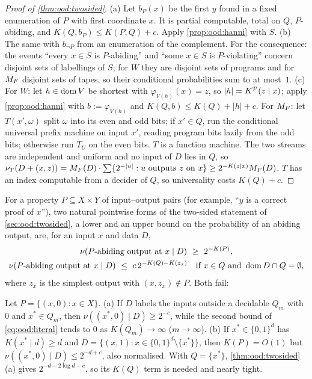 \begin{proof}[Proof of \cref{thm:ood:twosided}]
(a) Let $b_P(x)$ be the first $y$ found in a fixed enumeration of $P$ with first coordinate $x$. It is partial computable, total on $Q$, $P$-abiding, and $K(Q,b_P)\le K(P,Q)+c$. Apply \cref{prop:ood:hanni} with $S$. (b) The same with $b_{\neg P}$ from an enumeration of the complement. For the consequence: the events ``every $x\in S$ is $P$-abiding'' and ``some $x\in S$ is $P$-violating'' concern disjoint sets of labellings of $S$; for $W$ they are disjoint sets of programs and for $M_{F}$ disjoint sets of tapes, so their conditional probabilities sum to at most~$1$. (c) For $W$: let $h\in\operatorname{dom} V$ be shortest with $\varphi_{V(h)}(x)=z$, so $|h|=K^{\mathcal{P}}(z\mid x)$; apply \cref{prop:ood:hanni} with $b:=\varphi_{V(h)}$ and $K(Q,b)\le K(Q)+|h|+c$. For $M_{F}$: let $T(x',\omega)$ split $\omega$ into its even and odd bits; if $x'\in Q$, run the conditional universal prefix machine on input $x'$, reading program bits lazily from the odd bits; otherwise run $T_U$ on the even bits. $T$ is a function machine. The two streams are independent and uniform and no input of $D$ lies in $Q$, so $\nu_T(D+(x,z))=M_{F}(D)\cdot\sum\{2^{-|u|}:u\text{ outputs }z\text{ on }x\}\ge2^{-K(z\mid x)}M_{F}(D)$. $T$ has an index computable from a decider of $Q$, so universality costs $K(Q)+c$.
\end{proof}

For a property $P\subseteq X\times Y$ of input--output pairs (for example, ``$y$ is a correct proof of $x$''), two natural pointwise forms of the two-sided statement of \cref{sec:ood:twosided}, a lower and an upper bound on the probability of an abiding output, are, for an input $x$ and data $D$,
\begin{equation}\label{eq:ood:literal}
\begin{gathered}
\nu(P\text{-abiding output at }x\mid D)\ \ge\ 2^{-K(P)},\\
\nu(P\text{-abiding output at }x\mid D)\ \le\ c\,2^{-K(Q)-K(z_x)}\quad\text{if }x\in Q\text{ and }\dom D\cap Q=\emptyset,
\end{gathered}
\end{equation}
where $z_x$ is the simplest output with $(x,z_x)\notin P$. Both fail:

\begin{proposition}\label{prop:ood:draftfalse}
Let $P=\{(x,0):x\in X\}$. (a) If $D$ labels the inputs outside a decidable $Q_m$ with $0$ and $x^*\in Q_m$, then $\nu((x^*,0)\mid D)\ge2^{-c}$, while the second bound of \eqref{eq:ood:literal} tends to $0$ as $K(Q_m)\to\infty$ ($m\to\infty$). (b) If $x^*\in\{0,1\}^d$ has $K(x^*\mid d)\ge d$ and $D=\{(x,1):x\in\{0,1\}^d\setminus\{x^*\}\}$, then $K(P)=O(1)$ but $\nu((x^*,0)\mid D)\le2^{-d+c}$, also normalised. With $Q=\{x^*\}$, \cref{thm:ood:twosided}(a) gives $2^{-d-2\log d-c}$, so its $K(Q)$ term is needed and nearly tight.
\end{proposition}

